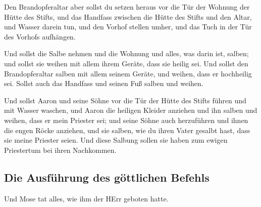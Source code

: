  Den Brandopferaltar aber sollst du setzen heraus vor die
Tür der Wohnung der Hütte des Stifts,  und das Handfass
zwischen die Hütte des Stifts und den Altar, und Wasser darein tun,
 und den Vorhof stellen umher, und das Tuch in der Tür des
Vorhofs aufhängen.

 Und sollst die Salbe nehmen und die Wohnung und alles,
was darin ist, salben; und sollst sie weihen mit allem ihrem Geräte,
dass sie heilig sei.  Und sollst den Brandopferaltar
salben mit allem seinem Geräte, und weihen, dass er hochheilig sei.
 Sollst auch das Handfass und seinen Fuß salben und
weihen.

 Und sollst Aaron und seine Söhne vor die Tür der Hütte
des Stifts führen und mit Wasser waschen,  und Aaron die
heiligen Kleider anziehen und ihn salben und weihen, dass er mein
Priester sei;  und seine Söhne auch herzuführen und ihnen
die engen Röcke anziehen,  und sie salben, wie du ihren
Vater gesalbt hast, dass sie meine Priester seien. Und diese Salbung
sollen sie haben zum ewigen Priestertum bei ihren Nachkommen.

\hypertarget{die-ausfuxfchrung-des-guxf6ttlichen-befehls}{%
\subsection{Die Ausführung des göttlichen
Befehls}\label{die-ausfuxfchrung-des-guxf6ttlichen-befehls}}

 Und Mose tat alles, wie ihm der HErr geboten hatte.

